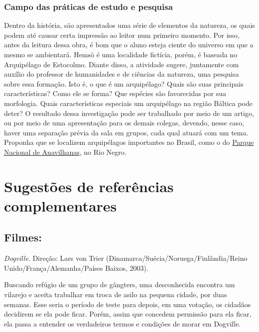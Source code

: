 \documentclass[12pt]{extarticle}
\begin{document}
\subsubsection{Campo das práticas de estudo e pesquisa}



Dentro da história, são apresentados uma série de elementos da
natureza, os quais podem até causar certa impressão ao leitor num
primeiro momento. Por isso, antes da leitura dessa obra, é bom que o
aluno esteja ciente do universo em que a mesmo se ambientará. Hemsö é
uma localidade fictícia, porém, é baseada no Arquipélago de Estocolmo.
Diante disso, a atividade sugere, juntamente com auxílio do professor de
humanidades e de ciências da natureza, uma pesquisa sobre essa formação.
Isto é, o que é um arquipélago? Quais são suas principais
características? Como ele se forma? Que espécies são favorecidas por sua
morfologia. Quais características especiais um arquipélago na região
Báltica pode deter? O resultado dessa investigação pode ser trabalhado
por meio de um artigo, ou por meio de uma apresentação para os demais
colegas, devendo, nesse caso, haver uma separação prévia da sala em
grupos, cada qual atuará com um tema. Proponha que se localizem arquipélagos
importantes no Brasil, como o do 
\href{https://pt.wikipedia.org/wiki/Parque_Nacional_de_Anavilhanas}{Parque Nacional de Anavilhanas}, no Rio Negro.




\section{Sugestões de referências complementares}\label{sugestoes}

\subsection{Filmes:}

\textit{Dogville}. Direção: Lars von Trier (Dinamarca/Suécia/Noruega/Finlândia/Reino Unido/França/Alemanha/Países Baixos, 2003).

Buscando refúgio de um grupo de gângters, uma desconhecida encontra um vilarejo e aceita 
trabalhar em troca de asilo na pequena cidade, por duas semanas. Esse seria o período de teste
para depois, em uma votação, os cidadãos decidirem se ela pode ficar. Porém, assim que concedem 
permissão para ela ficar, ela passa a entender os verdadeiros termos e condições de morar em Dogville.
\end{document}

